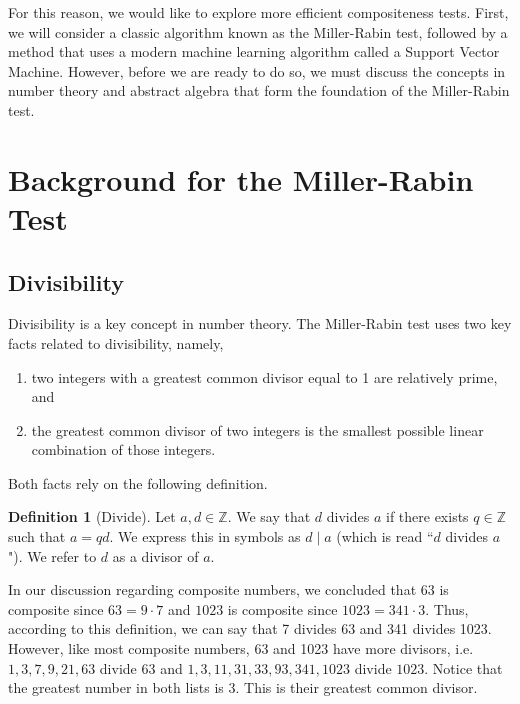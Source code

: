 \documentclass[10pt, titlepage]{amsart}
\newcommand\Z{{\mathbb Z}}
\theoremstyle{definition}
\newtheorem{definition}{Definition}[subsection]
\begin{document}
	For this reason, we would like to explore more efficient compositeness tests. First, we will consider a classic algorithm known as the Miller-Rabin test, followed by a method that uses a modern machine learning algorithm called a Support Vector Machine. However, before we are ready to do so, we must discuss the concepts in number theory and abstract algebra that form the foundation of the Miller-Rabin test.
	
	\section{Background for the Miller-Rabin Test}
	
	\subsection{Divisibility}
	Divisibility is a key concept in number theory.
	The Miller-Rabin test uses two key facts related to divisibility, namely,
	\begin{enumerate}
		\item two integers with a greatest common divisor equal to 1 are relatively prime, and 
		\item the greatest common divisor of two integers is the smallest possible linear combination of those integers. 
	\end{enumerate}
	Both facts rely on the following definition.
		
	\begin{definition}[Divide]\label{definition:divide}
		Let $a,d \in \Z$. We say that $d$ divides $a$ if there exists $q \in \Z$ such that $a = qd$. We express this in symbols as $d \mid a$ (which is read ``$d$ divides $a$"). We refer to $d$ as a divisor of $a$. \cite{pommersheim}
	\end{definition}
	
	In our discussion regarding composite numbers, we concluded that $63$ is composite since $63 = 9 \cdot 7$ and $1023$ is composite since $1023 = 341 \cdot 3$. Thus, according to this definition, we can say that 7 divides 63 and 341 divides 1023. However, like most composite numbers, 63 and 1023 have more divisors, i.e. $1, 3, 7, 9, 21, 63$ divide $63$ and $1, 3, 11, 31, 33, 93, 341, 1023$ divide $1023$. Notice that the greatest number in both lists is $3$. This is their greatest common divisor.
	
\end{document}
